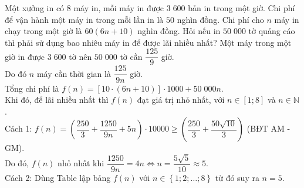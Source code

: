 \begin{ex}%
	Một xưởng in có $8$ máy in, mỗi máy in được $3\;600$ bản in trong một giờ. Chi phí để vận hành một máy in trong mỗi lần in là $50$ nghìn đồng. Chi phí cho $n$ máy in chạy trong một giờ là $60(6n+10)$ nghìn đồng. Hỏi nếu in $50\;000$ tờ quảng cáo thì phải sử dụng bao nhiêu máy in để được lãi nhiều nhất?	
	\loigiai
	{Một máy trong một giờ in được $3\;600$ tờ nên $50\;000$ tờ cần $\dfrac{125}{9}$ giờ.\\
		Do đó $n$ máy cần thời gian là $\dfrac{125}{9n}$ giờ.\\
		Tổng chi phí là $f(n)=\left[10\cdot \left(6n+10\right)\right]\cdot 1000+50\;000n$.\\
		Khi đó, để lãi nhiều nhất thì $f(n)$ đạt giá trị nhỏ nhất, với $n\in \left[1;8\right]$ và $n\in \mathbb{N}$.\\
		Cách 1: $f(n)=\left(\dfrac{250}{3}+\dfrac{1250}{9n}+5n\right)\cdot 10000\geq \left(\dfrac{250}{3}+\dfrac{50\sqrt{10}}{3}\right)$ (BĐT AM - GM).\\
		Do đó, $f(n)$ nhỏ nhất khi $\dfrac{1250}{9n}=4n\Leftrightarrow n =\dfrac{5\sqrt{5}}{10}\approx 5$.\\
		Cách 2: Dùng Table lập bảng $f(n)$ với $n\in \left\{1; 2; \ldots ; 8\right\}$ từ đó suy ra $n=5$.  
	}
\end{ex}

